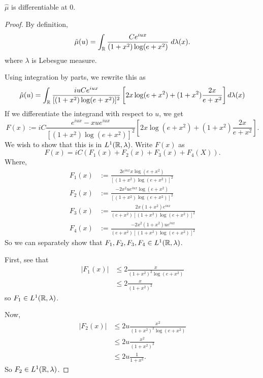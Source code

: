 \documentclass{unswmaths}
\begin{document}
\begin{lemma}
    $\hat{\mu}$ is differentiable at $0$.
\end{lemma}
\begin{proof}
    By definition,
    \begin{equation*}
        \hat{\mu}(u) = \int_{\mathbb{R}} \frac{Ce^{iux}}{(1+x^2)\log(e+x^2)}\;d\lambda(x).
    \end{equation*}
    where $\lambda$ is Lebesgue measure.
    
    Using integration by parts, we rewrite this as
    \begin{equation*}
        \hat{\mu}(u) = \int_{\mathbb{R}} \frac{iuCe^{iux}}{[(1+x^2)\log(e+x^2)]^2}\left[2x\log(e+x^2)+(1+x^2)\frac{2x}{e+x^2}\right]d\lambda(x)
    \end{equation*}
    If we differentiate the integrand with respect to $u$, we get
    \begin{equation*}
        F(x) := iC\frac{e^{iux}-xue^{iux}}{[(1+x^2)\log(e+x^2)]^2}\left[2x\log(e+x^2)+(1+x^2)\frac{2x}{e+x^2}\right].
    \end{equation*}
    We wish to show that this is in $L^1(\mathbb{R},\lambda)$. Write $F(x)$
    as
    \begin{equation*}
        F(x) = iC(F_1(x)+F_2(x)+F_3(x)+F_4(X)).
    \end{equation*}
    Where,
    \begin{align*}
        F_1(x) &:= \frac{2e^{iux}x\log(e+x^2)}{[(1+x^2)\log(e+x^2)]^2}\\
        F_2(x) &:= \frac{-2x^2ue^{iux}\log(e+x^2)}{[(1+x^2)\log(e+x^2)]^2}\\
        F_3(x) &:= \frac{2x(1+x^2)e^{iux}}{(e+x^2)[(1+x^2)\log(e+x^2)]^2}\\
        F_4(x) &:= \frac{-2x^2(1+x^2)ue^{iux}}{(e+x^2)[(1+x^2)\log(e+x^2)]^2}
    \end{align*}
    So we can separately show that $F_1,F_2,F_3,F_4 \in L^1(\mathbb{R},\lambda)$.
    
    First, see that
    \begin{align*}
        |F_1(x)| &\leq 2\frac{x}{(1+x^2)^2\log(e+x^2)}\\
        &\leq 2\frac{x}{(1+x^2)^2}
    \end{align*}
    so $F_1 \in L^1(\mathbb{R},\lambda)$.
    
    Now,
    \begin{align*}
        |F_2(x)| &\leq 2u\frac{x^2}{(1+x^2)^2\log(e+x^2)}\\
        &\leq 2u\frac{x^2}{(1+x^2)^2}\\
        &\leq 2u\frac{1}{1+x^2}.
    \end{align*}
    So $F_2 \in L^1(\mathbb{R},\lambda)$.
    

\end{proof}
\end{document}
